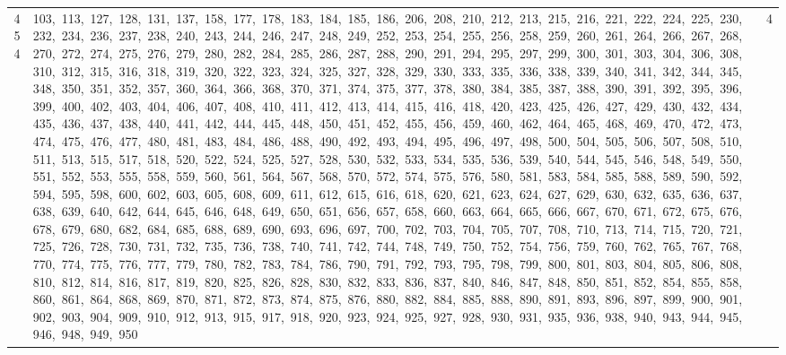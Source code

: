 \begin{longtable}{c|p{}|r}
454 & 103,\ 113,\ 127,\ 128,\ 131,\ 137,\ 158,\ 177,\ 178,\ 183,\ 184,\ 185,\ 186,\ 206,\ 208,\ 210,\ 212,\ 213,\ 215,\ 216,\ 221,\ 222,\ 224,\ 225,\ 230,\ 232,\ 234,\ 236,\ 237,\ 238,\ 240,\ 243,\ 244,\ 246,\ 247,\ 248,\ 249,\ 252,\ 253,\ 254,\ 255,\ 256,\ 258,\ 259,\ 260,\ 261,\ 264,\ 266,\ 267,\ 268,\ 270,\ 272,\ 274,\ 275,\ 276,\ 279,\ 280,\ 282,\ 284,\ 285,\ 286,\ 287,\ 288,\ 290,\ 291,\ 294,\ 295,\ 297,\ 299,\ 300,\ 301,\ 303,\ 304,\ 306,\ 308,\ 310,\ 312,\ 315,\ 316,\ 318,\ 319,\ 320,\ 322,\ 323,\ 324,\ 325,\ 327,\ 328,\ 329,\ 330,\ 333,\ 335,\ 336,\ 338,\ 339,\ 340,\ 341,\ 342,\ 344,\ 345,\ 348,\ 350,\ 351,\ 352,\ 357,\ 360,\ 364,\ 366,\ 368,\ 370,\ 371,\ 374,\ 375,\ 377,\ 378,\ 380,\ 384,\ 385,\ 387,\ 388,\ 390,\ 391,\ 392,\ 395,\ 396,\ 399,\ 400,\ 402,\ 403,\ 404,\ 406,\ 407,\ 408,\ 410,\ 411,\ 412,\ 413,\ 414,\ 415,\ 416,\ 418,\ 420,\ 423,\ 425,\ 426,\ 427,\ 429,\ 430,\ 432,\ 434,\ 435,\ 436,\ 437,\ 438,\ 440,\ 441,\ 442,\ 444,\ 445,\ 448,\ 450,\ 451,\ 452,\ 455,\ 456,\ 459,\ 460,\ 462,\ 464,\ 465,\ 468,\ 469,\ 470,\ 472,\ 473,\ 474,\ 475,\ 476,\ 477,\ 480,\ 481,\ 483,\ 484,\ 486,\ 488,\ 490,\ 492,\ 493,\ 494,\ 495,\ 496,\ 497,\ 498,\ 500,\ 504,\ 505,\ 506,\ 507,\ 508,\ 510,\ 511,\ 513,\ 515,\ 517,\ 518,\ 520,\ 522,\ 524,\ 525,\ 527,\ 528,\ 530,\ 532,\ 533,\ 534,\ 535,\ 536,\ 539,\ 540,\ 544,\ 545,\ 546,\ 548,\ 549,\ 550,\ 551,\ 552,\ 553,\ 555,\ 558,\ 559,\ 560,\ 561,\ 564,\ 567,\ 568,\ 570,\ 572,\ 574,\ 575,\ 576,\ 580,\ 581,\ 583,\ 584,\ 585,\ 588,\ 589,\ 590,\ 592,\ 594,\ 595,\ 598,\ 600,\ 602,\ 603,\ 605,\ 608,\ 609,\ 611,\ 612,\ 615,\ 616,\ 618,\ 620,\ 621,\ 623,\ 624,\ 627,\ 629,\ 630,\ 632,\ 635,\ 636,\ 637,\ 638,\ 639,\ 640,\ 642,\ 644,\ 645,\ 646,\ 648,\ 649,\ 650,\ 651,\ 656,\ 657,\ 658,\ 660,\ 663,\ 664,\ 665,\ 666,\ 667,\ 670,\ 671,\ 672,\ 675,\ 676,\ 678,\ 679,\ 680,\ 682,\ 684,\ 685,\ 688,\ 689,\ 690,\ 693,\ 696,\ 697,\ 700,\ 702,\ 703,\ 704,\ 705,\ 707,\ 708,\ 710,\ 713,\ 714,\ 715,\ 720,\ 721,\ 725,\ 726,\ 728,\ 730,\ 731,\ 732,\ 735,\ 736,\ 738,\ 740,\ 741,\ 742,\ 744,\ 748,\ 749,\ 750,\ 752,\ 754,\ 756,\ 759,\ 760,\ 762,\ 765,\ 767,\ 768,\ 770,\ 774,\ 775,\ 776,\ 777,\ 779,\ 780,\ 782,\ 783,\ 784,\ 786,\ 790,\ 791,\ 792,\ 793,\ 795,\ 798,\ 799,\ 800,\ 801,\ 803,\ 804,\ 805,\ 806,\ 808,\ 810,\ 812,\ 814,\ 816,\ 817,\ 819,\ 820,\ 825,\ 826,\ 828,\ 830,\ 832,\ 833,\ 836,\ 837,\ 840,\ 846,\ 847,\ 848,\ 850,\ 851,\ 852,\ 854,\ 855,\ 858,\ 860,\ 861,\ 864,\ 868,\ 869,\ 870,\ 871,\ 872,\ 873,\ 874,\ 875,\ 876,\ 880,\ 882,\ 884,\ 885,\ 888,\ 890,\ 891,\ 893,\ 896,\ 897,\ 899,\ 900,\ 901,\ 902,\ 903,\ 904,\ 909,\ 910,\ 912,\ 913,\ 915,\ 917,\ 918,\ 920,\ 923,\ 924,\ 925,\ 927,\ 928,\ 930,\ 931,\ 935,\ 936,\ 938,\ 940,\ 943,\ 944,\ 945,\ 946,\ 948,\ 949,\ 950 & 4 \\

\end{longtable}
